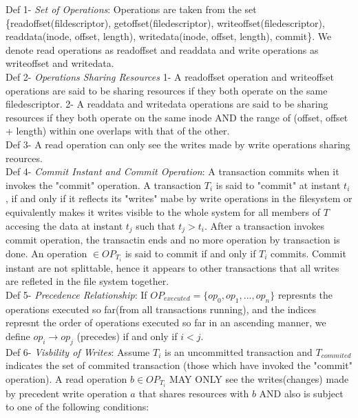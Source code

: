 \documentclass[a4paper, 11pt]{article}
\begin{document}
Def 1- \emph{Set of Operations}: Operations are taken from the set \{readoffset(fildescriptor), getoffset(filedescriptor), writeoffset(filedescriptor), readdata(inode, offset, length), writedata(inode, offset, length), commit\}. We denote read operations as readoffset and readdata and write operations as writeoffset and writedata.\\

Def 2- \emph{Operations Sharing Resources} 1- A readoffset operation and writeoffset operations are said to be sharing resources if they both operate on the same filedescriptor. 2- A readdata and writedata operations are said to be sharing resources if they both operate on the same inode AND the range of (offset, offset + length) within one overlaps with that of the other.\\ 

Def 3- A read operation can only see the writes made by write operations sharing reources.\\ 

Def 4- \emph{Commit Instant and Commit Operation}: A transaction commits when it invokes the "commit" operation. A transaction $T_i$ is said to "commit" at instant $t_i$, if and only if it reflects its "writes" mabe by write operations in the filesystem or equivalently makes it writes visible to the whole system for all members of $T$ accesing the data at instant $t_j$ such that $t_j > t_i$. After a transaction invokes commit operation, the transactin ends and no more operation by transaction is done. An operation $\in OP_{T_i}$ is said to commit if and only if $T_i$ commits. Commit instant are not splittable, hence it appears to other transactions that all writes are refleted in the file system together.\\ 

Def 5- \emph{Precedence Relationship}: If $OP_{executed} = \{op_0, op_1, ..., op_n\}$ represnts the operations executed so far(from all transactions running), and the indices represnt the order of operations executed so far in an ascending manner, we define $op_i \rightarrow op_j$ (precedes) if and only if $i<j$.\\ 

Def 6- \emph{Visbility of Writes}: Assume $T_i$ is an uncommitted transaction and $T_{commited}$ indicates the set of commited transaction (those which have invoked the "commit" operation). A read operation $b \in OP_{T_i}$ MAY ONLY see the writes(changes) made by precedent write operation $a$ that shares resources with $b$ AND also is subject to one of the following conditions:\\
\end{document}
